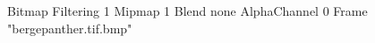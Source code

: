 {Bitmap
	{Filtering 1}
	{Mipmap 1}
	{Blend none}
	{AlphaChannel 0}
	{Frame "bergepanther.tif.bmp"}
}
